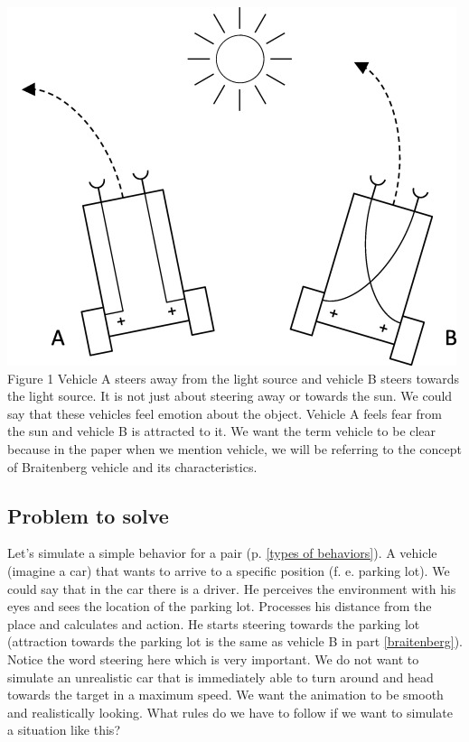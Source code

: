 \documentclass[10pt,twoside,english,a4paper]{article}
\begin{document}
\includegraphics[scale=0.45]{braitenberg.jpg}
\quad Figure 1
\bigbreak
Vehicle A steers away from the light source and vehicle B steers towards the light source. It is not just about steering away or towards the sun. We could say that these vehicles feel emotion about the object. Vehicle A feels fear from the sun and vehicle B is attracted to it. We want the term vehicle to be clear because in the paper when we mention vehicle, we will be referring to the concept of Braitenberg vehicle and its characteristics. 

\subsection{Problem to solve} \label{problem to solve}

Let’s simulate a simple behavior for a pair (p. \ref{types of behaviors}). A vehicle (imagine a car) that wants to arrive to a specific position (f. e. parking lot). We could say that in the car there is a driver. He perceives the environment with his eyes and sees the location of the parking lot. Processes his distance from the place and calculates and action. He starts steering towards the parking lot (attraction towards the parking lot is the same as vehicle B in part \ref{braitenberg}). Notice the word steering here which is very important. We do not want to simulate an unrealistic car that is immediately able to turn around and head towards the target in a maximum speed. We want the animation to be smooth and realistically looking. What rules do we have to follow if we want to simulate a situation like this?
\end{document}
